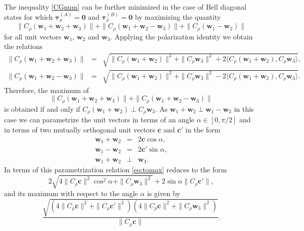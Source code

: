 \documentclass[12pt]{iopart}
\begin{document}
The inequality \eqref{CGnum} can be further minimized in the case of Bell diagonal states for which $\bm{\tau}^{(A)}_{\rho}=\bm{0}$ and $\bm{\tau}^{(B)}_{\rho}=\bm{0}$ by maximizing the quantity
\begin{equation}
 \|C_{\rho} \left(\bm{w}_1 +\bm{w}_2 +\bm{w}_3 \right)\|+\|C_{\rho} \left(\bm{w}_1 +\bm{w}_2 -\bm{w}_3 \right)\|+\|C_{\rho} \left(\bm{w}_1 -\bm{w}_2\right)\| \label{eq:tomax}
\end{equation}
for all unit vectors $\bm{w}_1$, $\bm{w}_2$ and $\bm{w}_3$. 
Applying the polarization identity we obtain the relations
\begin{eqnarray}
 \|C_{\rho} \left(\bm{w}_1 +\bm{w}_2 +\bm{w}_3 \right)\|&=& \sqrt{\|C_{\rho} \left(\bm{w}_1 + \bm{w}_2 \right)\|^2+\|C_{\rho} \bm{w}_3\|^2+2 \langle C_{\rho} \left(\bm{w}_1 + \bm{w}_2 \right), C_{\rho} \bm{w}_3 
 \rangle },\nonumber \\
  \|C_{\rho} \left(\bm{w}_1 +\bm{w}_2 -\bm{w}_3 \right)\|&=& \sqrt{\|C_{\rho} \left(\bm{w}_1 + \bm{w}_2 \right)\|^2+\|C_{\rho} \bm{w}_3\|^2-2 \langle C_{\rho} \left(\bm{w}_1 + \bm{w}_2 \right), C_{\rho} \bm{w}_3 
 \rangle}. \nonumber 
\end{eqnarray}
Therefore, the maximum of 
\begin{equation}
 \|C_{\rho} \left(\bm{w}_1 +\bm{w}_2 +\bm{w}_3 \right)\|+ \|C_{\rho} \left(\bm{w}_1 +\bm{w}_2 -\bm{w}_3 \right)\| \nonumber
\end{equation}
is obtained if and only if $C_{\rho} \left(\bm{w}_1+\bm{w}_2 \right) \perp C_{\rho} \bm{w}_3$. 
As $\bm{w}_1 +\bm{w}_2 \perp \bm{w}_1 -\bm{w}_2$ in this case we can parametrize the unit vectors in terms of an angle $\alpha \in [0,\pi/2]$ and in terms of two mutually orthogonal unit vectors $\bm{c}$ and $\bm{c}'$ in the form
\begin{eqnarray}
 \bm{w}_1 +\bm{w}_2&=& 2 \bm{c} \cos \alpha, \nonumber \\
 \bm{w}_1 -\bm{w}_2&=&2 \bm{c}'\sin \alpha, \nonumber \\
 \bm{w}_1 +\bm{w}_2 &\perp& \bm{w}_3. \nonumber 
\end{eqnarray}
In terms of this parametrization relation \eqref{eq:tomax} reduces to the form
\begin{equation}
 2 \sqrt{4 \|C_{\rho} \bm{c}\|^2 \cos^2 \alpha + \|C_{\rho} \bm{w}_3\|^2}+2 \sin \alpha \|C_{\rho} \bm{c}'\|, \nonumber
\end{equation}
and its maximum with respect to the angle $\alpha$ is given by
\begin{equation}
 \frac{\sqrt{\left(4\|C_{\rho} \bm{c}\|^2+\|C_{\rho} \bm{c}'\|^2\right)\left(4\|C_{\rho} \bm{c}\|^2+\|C_{\rho} \bm{w}_3\|^2\right)}}{\|C_{\rho} \bm{c}\|}. \nonumber
\end{equation}
\end{document}
